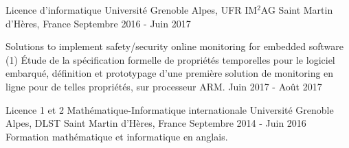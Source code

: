 \begin{cventries}
\vspace{-.5cm}


\cventry
{Licence d'informatique} %
{Université Grenoble Alpes, UFR IM$^2$AG} %
{Saint Martin d'Hères, France} %
{Septembre 2016 - Juin 2017} %
{}

%
{}%
{}%
{}%
{
  \begin{cvdescription}
    {Solutions to implement safety/security online monitoring for
      embedded software (1)}%
    {Étude de la spécification formelle de propriétés temporelles pour
      le logiciel embarqué, définition et prototypage d'une première
      solution de monitoring en ligne pour de telles propriétés, sur
      processeur ARM.}%
    {Juin 2017 - Août 2017}
  \end{cvdescription}
}

\vspace{-.2cm}


\cventry
{Licence 1 et 2 Mathématique-Informatique internationale} %
{Université Grenoble Alpes, DLST} %
{Saint Martin d'Hères, France} %
{Septembre 2014 - Juin 2016} %
{Formation mathématique et informatique en anglais.}


\end{cventries}
